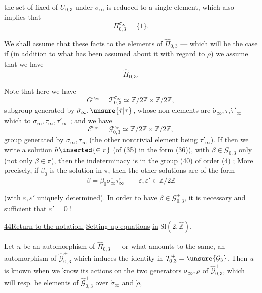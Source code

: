 
the set of fixed  of $U_{0,3}$ under $\dot{\sigma}_\infty$ is reduced to a single element, which also implies that
\[
\Pi_{0,3}^{\sigma_\infty}=\{1\}.
\]

We shall  assume that these facts  to the elements of $\widehat{\Pi}_{0,3}$ --- which will be the case if (in addition to what has been assumed about it with regard to $\rho$) we assume that we  have
\[
\tag{38}
\widehat{\Pi}_{0,3}.
\]

Note that here we have
\[
\tag{39}
G^{\sigma_\infty}=\mathcal T_{0,3}^{\sigma_\infty}\simeq\mathbb Z/2\mathbb Z\times\mathbb Z/2\mathbb Z,
\]
subgroup generated by $\dot{\sigma}_\infty,\unsure{\dot\tau|\tau}$, whose non elements are $\dot{\sigma}_\infty,\tau,\dot{\tau}'_\infty$ --- which  to $\sigma_\infty,\tau_\infty,\tau'_\infty$ ; and we have
\[
\tag{40}
\mathcal E^{\sigma_\infty}=\mathcal G_{0,3}^{\sigma_\infty}\simeq\mathbb Z/2\mathbb Z\times\mathbb Z/2\mathbb Z,
\]
group generated by $\sigma_\infty,\tau_\infty$ (the other nontrivial element being $\tau'_\infty$). If then we write a solution $h\inserted{\in\pi}$ (of (35) in the form (36)), with $\beta\in\mathcal G_{0,3}$ only (not only $\beta\in\pi$), then the indeterminacy is in the group (40) of order (4) ; More precisely, if $\beta_0$ is the solution in $\pi$, then the other solutions are of the form
\[
\tag{41}
\beta=\beta_0\sigma_\infty^\varepsilon\tau_\infty^{\varepsilon'}
\qquad \varepsilon,\varepsilon'\in\mathbb Z/2\mathbb Z
\]



(with $\varepsilon,\varepsilon'$ uniquely determined). In order to have $\beta\in\mathcal G_{0,3}^{+}$, it is necessary and sufficient that $\varepsilon'=0$ !




\uline{44}\qquad \uline{Return to the notation.} \uline{Setting up equations} \uline{in} $\mathrm{Sl}(2,\widehat{\mathbb Z})$.

Let $u$ be an automorphism of $\widehat{\Pi}_{0,3}$  --- or what amounts to the same, an automorphism of $\widehat{\mathcal G}_{0,3}^{+}$ which induces the identity in $\mathcal T_{0,3}^{+}=\unsure{\mathcal G_3}$. Then $u$ is known when we know its actions on the two generators $\sigma_\infty,\rho$ of $\widehat{\mathcal G}_{0,3}^{+}$, which will resp. be elements of $\widehat{\mathcal G}_{0,3}^{+}$ over $\dot{\sigma}_\infty$ and $\dot\rho$,

